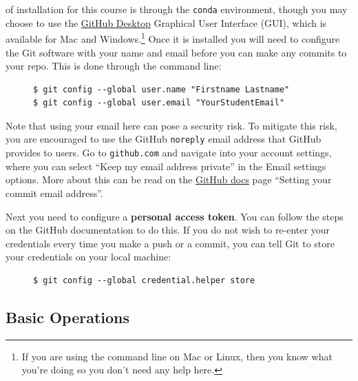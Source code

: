 \documentclass{tufte-book}
\begin{document}
 of installation for this course is through the \verb|conda| environment, though you may choose to use the {\href{https://docs.github.com/en/desktop/overview/getting-started-with-github-desktop}{GitHub Desktop}} Graphical User Interface (GUI), which is available for Mac and Windows.\footnote{If you are using the command line on Mac or Linux, then you know what you're doing so you don't need any help here.} Once it is installed you will need to configure the Git software with your name and email before you can make any commits to your repo. This is done through the command line:

\begin{figure}
\begin{lstlisting}[backgroundcolor=\color{lightgray}]
$ git config --global user.name "Firstname Lastname"
$ git config --global user.email "YourStudentEmail"
\end{lstlisting}
\end{figure}

Note that using your email here can pose a security risk. To mitigate this risk, you are encouraged to use the GitHub \verb|noreply| email address that GitHub provides to users. Go to \texttt{github.com} and navigate into your account settings, where you can select ``Keep my email address private'' in the Email settings options. More about this can be read on the \href{https://docs.github.com/en/account-and-profile/setting-up-and-managing-your-personal-account-on-github/managing-email-preferences/setting-your-commit-email-address}{GitHub docs} page ``Setting your commit email address''.

Next you need to configure a \textbf{personal access token}. You can follow the steps on the GitHub documentation to do this. If you do not wish to re-enter your credentials every time you make a push or a commit, you can tell Git to store your credentials on your local machine:

\begin{figure}
\begin{lstlisting}[backgroundcolor=\color{lightgray}]
$ git config --global credential.helper store
\end{lstlisting}
\end{figure}

\subsection{Basic Operations}\label{subsec:basic-ops} %
\end{document}
